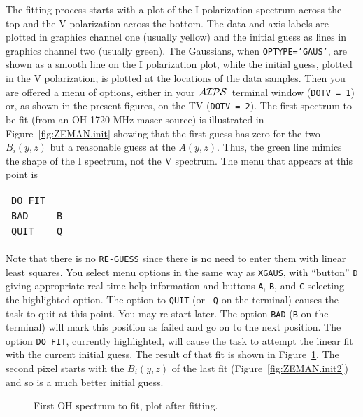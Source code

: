 \documentclass[twoside]{article}
\newcommand{\AIPS}{{$\cal AIPS\/$}}
\newcommand{\putfig}[1]{\texttt{[image: \#1.eps]}}
\begin{document}
The fitting process starts with a plot of the I polarization spectrum
across the top and the V polarization across the bottom.  The data
and axis labels are plotted in graphics channel one (usually yellow)
and the initial guess as lines in graphics channel two (usually
green).  The Gaussians, when {\tt OPTYPE='GAUS'}, are shown as a
smooth line on the I polarization plot, while the initial guess,
plotted in the V polarization, is plotted at the locations of the data
samples.  Then you are offered a menu of options, either in your
\AIPS\ terminal window ({\tt DOTV = 1}) or, as shown in the present
figures, on the TV ({\tt DOTV = 2}).  The first spectrum to be fit
(from an OH 1720 MHz maser source) is illustrated in
Figure~\ref{fig:ZEMAN.init} showing that the first guess has zero for
the two $B_i(y,z)$ but a reasonable guess at the $A(y,z)$.  Thus, the
green line mimics the shape of the I spectrum, not the V spectrum.
The menu that appears at this point is\\
\begin{center}
\begin{tabular}{|l|l|}\hline
   {\tt DO FIT}   & {\tt \hphantom{A}} \\
   {\tt BAD}      & {\tt B} \\
   {\tt QUIT}     & {\tt Q} \\ \hline
\end{tabular}
\end{center}
Note that there is no {\tt RE-GUESS} since there is no need to enter
them with linear least squares.  You select menu options in the same
way as {\tt XGAUS}, with ``button'' {\tt D} giving appropriate
real-time help information and buttons {\tt A}, {\tt B}, and {\tt C}
selecting the highlighted option.  The option to {\tt QUIT} (or {\tt
  Q} on the terminal) causes the task to quit at this point.  You may
re-start later.  The option {\tt BAD} ({\tt B} on the terminal) will
mark this position as failed and go on to the next position.  The
option {\tt DO FIT}, currently highlighted, will cause the task to
attempt the linear fit with the current initial guess.  The result of
that fit is shown in Figure~\ref{fig:ZEMAN.good}.  The second pixel
starts with the $B_i(y,z)$ of the last fit
(Figure~\ref{fig:ZEMAN.init2}) and so is a much better initial guess.

\begin{figure}
\begin{center}
\resizebox{5.5in}{!}{\putfig{ZEMAN.good}}
\caption{First OH spectrum to fit, plot after fitting.}
\label{fig:ZEMAN.good}
\end{center}
\end{figure}
\end{document}
